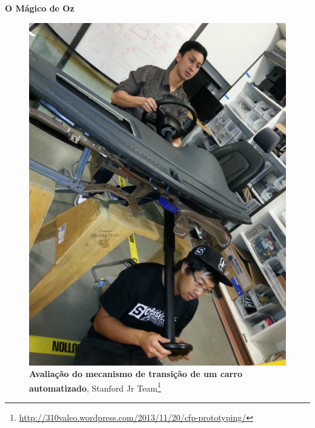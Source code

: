 \expandafter\documentclass\expandafter[table, usenames, svgnames, dvipsnames, \classopts]{beamer}
\begin{document}
\begin{frame}{\textbf{O Mágico de Oz}}

	\begin{figure}
	    \centering
        \includegraphics[height=0.7\paperheight]{wizard-of-oz}
        \caption{\textbf{Avaliação do mecanismo de transição de um carro automatizado}, Stanford Jr Team\footnote{\url{http://310valeo.wordpress.com/2013/11/20/cfp-prototyping/}}}
    \end{figure}

\end{frame}
\end{document}
